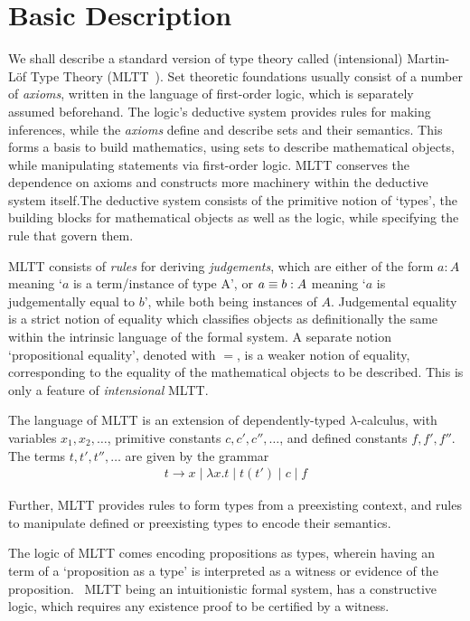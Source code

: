 \section{Basic Description}

We shall describe a standard version of type theory called (intensional) Martin-L\"of Type Theory (MLTT~\cite{martin1975intuitionistic}). 
Set theoretic foundations usually consist of a number of \textit{axioms}, written in the language of 
first-order logic, which is separately assumed beforehand. The logic's deductive system provides rules for making  
inferences, while the \textit{axioms} define and describe sets and
their semantics. This forms a basis to build mathematics, using sets to describe mathematical
objects, while manipulating statements via first-order logic.
MLTT conserves the dependence on axioms and constructs more machinery within the deductive system itself.The
deductive system consists of the primitive notion of `types', the building blocks
for mathematical objects as well as the logic, while specifying the rule that govern them. 

MLTT consists of \textit{rules} for deriving \textit{judgements}, which are either of the form
$ a : A$ meaning `$a$ is a term/instance of type A', or $a \equiv b : A$ meaning `$a$ is judgementally equal to $b$',
while both being instances of $A$.
Judgemental equality is a strict notion of equality which classifies objects as definitionally
the same within the intrinsic language of the formal system.
A separate notion `propositional equality', denoted with $=$, is a weaker notion of equality, corresponding
to the equality of the mathematical objects to be described. This is only a feature of \emph{intensional} MLTT.

The language of MLTT is an extension of dependently-typed $\lambda$-calculus, with variables
$x_1, x_2, \ldots$, primitive constants $c, c', c'', \ldots$, and defined constants $f, f', f''$.
The terms $t, t', t'', \ldots$ are given by the grammar 
\begin{align*}
  t \to x \mid \lambda x.t \mid t(t') \mid  c \mid f
\end{align*}

Further, MLTT provides rules to form types from a preexisting context, and rules to manipulate defined or preexisting types 
to encode their semantics.

The logic of MLTT comes encoding propositions as types, wherein having an term of a `proposition as a type'
is interpreted as a witness or evidence of the proposition.~\cite{awodey2004propositions} MLTT being an intuitionistic formal system, has a constructive
logic, which requires any existence proof to be certified by a witness. ~\cite{martin1975intuitionistic}

